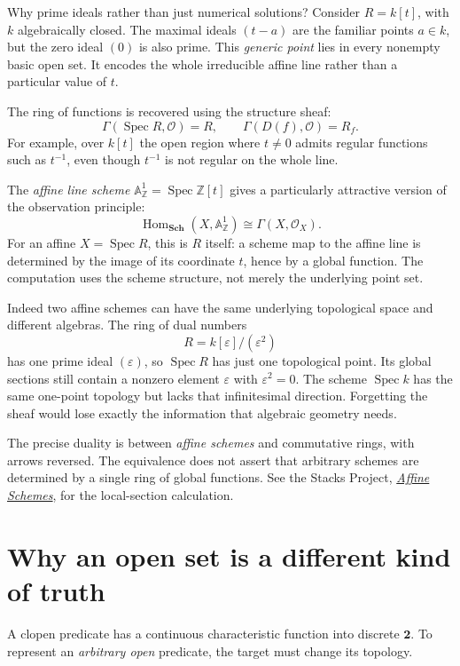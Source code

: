 Why prime ideals rather than just numerical solutions? Consider $R=k[t]$, with $k$ algebraically closed. The maximal ideals $(t-a)$ are the familiar points $a\in k$, but the zero ideal $(0)$ is also prime. This \emph{generic point} lies in every nonempty basic open set. It encodes the whole irreducible affine line rather than a particular value of $t$.

The ring of functions is recovered using the structure sheaf:
\[
 \Gamma(\operatorname{Spec}R,\mathcal O)=R,
 \qquad
 \Gamma(D(f),\mathcal O)=R_f.
\]
For example, over $k[t]$ the open region where $t\ne0$ admits regular functions such as $t^{-1}$, even though $t^{-1}$ is not regular on the whole line.

The \emph{affine line scheme} $\mathbb A^1_{\mathbb Z}=\operatorname{Spec}\mathbb Z[t]$ gives a particularly attractive version of the observation principle:
\[
 \boxed{\operatorname{Hom}_{\mathbf{Sch}}
       (X,\mathbb A^1_{\mathbb Z})
       \cong\Gamma(X,\mathcal O_X).}
\]
For an affine $X=\operatorname{Spec}R$, this is $R$ itself: a scheme map to the affine line is determined by the image of its coordinate $t$, hence by a global function. The computation uses the scheme structure, not merely the underlying point set.

Indeed two affine schemes can have the same underlying topological space and different algebras. The ring of dual numbers
\[
 R=k[\varepsilon]/(\varepsilon^2)
\]
has one prime ideal $(\varepsilon)$, so $\operatorname{Spec}R$ has just one topological point. Its global sections still contain a nonzero element $\varepsilon$ with $\varepsilon^2=0$. The scheme $\operatorname{Spec}k$ has the same one-point topology but lacks that infinitesimal direction. Forgetting the sheaf would lose exactly the information that algebraic geometry needs.

The precise duality is between \emph{affine schemes} and commutative rings, with arrows reversed. The equivalence does not assert that arbitrary schemes are determined by a single ring of global functions. See the Stacks Project, \href{https://stacks.math.columbia.edu/tag/01HR}{\emph{Affine Schemes}}, for the local-section calculation.


\section{Why an open set is a different kind of truth}

A clopen predicate has a continuous characteristic function into discrete $\mathbf2$. To represent an \emph{arbitrary open} predicate, the target must change its topology.

